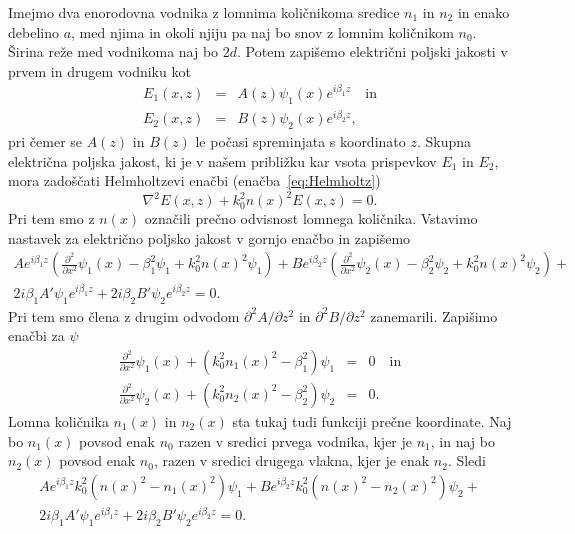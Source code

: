 Imejmo dva enorodovna vodnika z lomnima količnikoma sredice $n_1$ in $n_2$ in enako 
debelino $a$, med njima in okoli njiju pa naj bo snov z lomnim količnikom $n_0$. Širina 
reže med vodnikoma naj bo $2d$.
Potem zapišemo električni poljski jakosti v prvem in drugem vodniku kot
\begin{eqnarray}
E_1(x,z) &=& A(z) \psi_1(x) e^{i \beta_1 z} \quad \mathrm{in}\\
E_2(x,z) &=& B(z) \psi_2(x) e^{i \beta_2 z},
\label{eq:10_ampl}
\end{eqnarray}
pri čemer se $A(z)$ in $B(z)$ le počasi spreminjata s koordinato $z$. Skupna električna poljska
jakost, ki je v našem približku kar vsota prispevkov $E_1$ in $E_2$, 
mora zadoščati Helmholtzevi enačbi
(enačba~\ref{eq:Helmholtz})
\begin{equation}
\nabla^{2}E(x,z)+k_0^{2}n(x)^2 E(x,z) =0.
\end{equation}
Pri tem smo z $n(x)$ označili prečno odvisnost lomnega količnika.
Vstavimo nastavek za električno poljsko jakost v gornjo enačbo in zapišemo
\begin{multline}
A e^{i \beta_1 z}\left(\frac{\partial^2}{\partial x^2}\psi_1(x) - \beta_1^2\psi_1 + k_0^2
n(x)^2 \psi_1 \right)
+ 
B e^{i \beta_2 z}\left(\frac{\partial^2}{\partial x^2}\psi_2(x) - \beta_2^2\psi_2 + k_0^2
n(x)^2 \psi_2 \right)+ \\2 i \beta_1 A' \psi_1 e^{i \beta_1 z}+
2 i \beta_2 B' \psi_2 e^{i \beta_2 z} = 0.
\end{multline}
Pri tem smo člena z drugim odvodom $\partial^2 A/\partial z^2$ in $\partial^2 B/\partial z^2$
zanemarili. Zapišimo enačbi za $\psi$
\begin{eqnarray}
\frac{\partial^2}{\partial x^2}\psi_1(x) + \left(k_0^2n_1(x)^2-\beta_1^2\right) \psi_1 &=&0 \quad \mathrm{in} \\
\frac{\partial^2}{\partial x^2}\psi_2(x) + \left(k_0^2n_2(x)^2-\beta_2^2\right) \psi_2 &=&0.
\end{eqnarray}
Lomna količnika $n_1(x)$ in $n_2(x)$ sta tukaj tudi funkciji prečne koordinate. Naj bo $n_1(x)$  
povsod enak $n_0$ razen v sredici prvega vodnika, kjer je $n_1$, in naj bo 
$n_2(x)$ povsod enak $n_0$, razen v sredici drugega vlakna, kjer je enak $n_2$. Sledi
\begin{multline}
A e^{i \beta_1 z}k_0^2\left(n(x)^2 -n_1(x)^2\right)\psi_1 
+ 
B e^{i \beta_2 z}k_0^2\left(n(x)^2 -n_2(x)^2\right)\psi_2 + \\2 i \beta_1 A' \psi_1 e^{i \beta_1 z}+
2 i \beta_2 B' \psi_2 e^{i \beta_2 z} = 0.
\end{multline}
